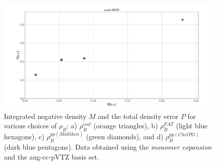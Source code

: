 \documentclass[amsmath,amssymb,preprint,aip,jcp]{revtex4-1}
\begin{document}
\begin{figure}
\centering
\includegraphics[width=1.0\linewidth]{M_vs_P_augccpVTZ.pdf}
\caption{Integrated negative density $M$ and the total density error $P$ for various choices of $\rho_B$: a) $\rho_B^{isol}$ (orange triangles), b) $\rho_B^{FAT}$ (light blue hexagons), c) $\rho_B^{pp(Mulliken)}$ (green diamonds), and d) $\rho_B^{pp(ChelPG)}$ (dark blue pentagons). Data obtained using the {\it monomer expansion} and the aug-cc-pVTZ basis set.}
\label{fig:M_vs_P_augccpVTZ}
\end{figure}
\end{document}
